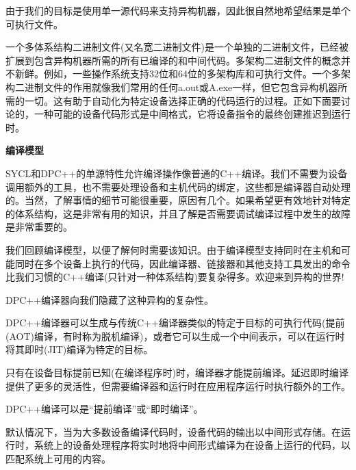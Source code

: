 由于我们的目标是使用单一源代码来支持异构机器，因此很自然地希望结果是单个可执行文件。\par

一个多体系结构二进制文件(又名宽二进制文件)是一个单独的二进制文件，已经被扩展到包含异构机器所需的所有已编译的和中间代码。多架构二进制文件的概念并不新鲜。例如，一些操作系统支持32位和64位的多架构库和可执行文件。一个多架构二进制文件的作用就像我们常用的任何a.out或A.exe一样，但它包含异构机器所需的一切。这有助于自动化为特定设备选择正确的代码运行的过程。正如下面要讨论的，一种可能的设备代码形式是中间格式，它将设备指令的最终创建推迟到运行时。\par

\hspace*{\fill} \par %
\textbf{编译模型}

SYCL和DPC++的单源特性允许编译操作像普通的C++编译。我们不需要为设备调用额外的工具，也不需要处理设备和主机代码的绑定，这些都是编译器自动处理的。当然，了解事情的细节可能很重要，原因有几个。如果希望更有效地针对特定的体系结构，这是非常有用的知识，并且了解是否需要调试编译过程中发生的故障是非常重要的。\par

我们回顾编译模型，以便了解何时需要该知识。由于编译模型支持同时在主机和可能同时在多个设备上执行的代码，因此编译器、链接器和其他支持工具发出的命令比我们习惯的C++编译(只针对一种体系结构)要复杂得多。欢迎来到异构的世界!\par

DPC++编译器向我们隐藏了这种异构的复杂性。\par

DPC++编译器可以生成与传统C++编译器类似的特定于目标的可执行代码(提前(AOT)编译，有时称为脱机编译)，或者它可以生成一个中间表示，可以在运行时将其即时(JIT)编译为特定的目标。\par

只有在设备目标提前已知(在编译程序时)时，编译器才能提前编译。延迟即时编译提供了更多的灵活性，但需要编译器和运行时在应用程序运行时执行额外的工作。\par

\begin{tcolorbox}[colback=red!5!white,colframe=red!75!black]
DPC++编译可以是“提前编译”或“即时编译”。
\end{tcolorbox}

默认情况下，当为大多数设备编译代码时，设备代码的输出以中间形式存储。在运行时，系统上的设备处理程序将实时地将中间形式编译为在设备上运行的代码，以匹配系统上可用的内容。\par

